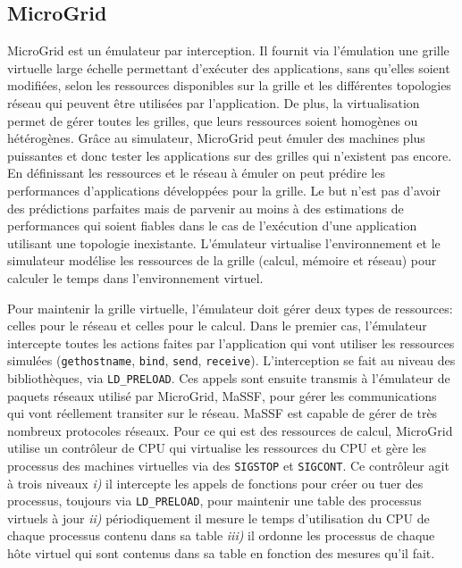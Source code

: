 \subsection{MicroGrid}
\label{subsection:MicroGrid}
MicroGrid \citep{MICROGRID_INIT, MICROGRID_CASANOVA} est un émulateur par interception. Il fournit via l'émulation une grille virtuelle large échelle permettant d'exécuter des applications, sans qu'elles soient modifiées, selon les ressources disponibles sur la grille et les différentes topologies réseau qui peuvent être utilisées par l'application. De plus, la virtualisation permet de gérer toutes les grilles, que leurs ressources soient homogènes ou hétérogènes. Grâce au simulateur, %
MicroGrid peut émuler des machines plus puissantes et donc tester les applications sur des grilles qui n'existent pas encore. En définissant les ressources et le réseau à émuler on peut prédire les performances d'applications développées pour la grille. Le but n'est pas d'avoir des prédictions parfaites mais de parvenir au moins à des estimations de performances qui soient fiables dans le cas de l'exécution d'une application utilisant une topologie inexistante. L'émulateur virtualise l'environnement et le simulateur modélise les ressources de la grille (calcul, mémoire et réseau) pour calculer le temps dans l'environnement virtuel.

Pour maintenir la grille virtuelle, l'émulateur doit gérer deux types de ressources: celles pour le réseau et celles pour le calcul. Dans le premier cas, l'émulateur intercepte toutes les actions faites par l'application qui vont utiliser les ressources simulées (\texttt{gethostname}, \texttt{bind}, \texttt{send}, \texttt{receive}). L'interception se fait au niveau des bibliothèques, via \texttt{LD\_PRELOAD}. Ces appels sont ensuite transmis à l'émulateur de paquets réseaux utilisé par MicroGrid, MaSSF, pour gérer les communications qui vont réellement transiter sur le réseau. MaSSF est capable de gérer de très nombreux protocoles réseaux.  Pour ce qui est des ressources de calcul, MicroGrid utilise un contrôleur de CPU qui virtualise les ressources du CPU et gère les processus des machines virtuelles via des \texttt{SIGSTOP} et \texttt{SIGCONT}. Ce contrôleur agit à trois niveaux \textit{i)} il intercepte les appels de fonctions pour créer ou tuer des processus, toujours via \texttt{LD\_PRELOAD}, pour maintenir une table des processus virtuels à jour \textit{ii)} périodiquement il mesure le temps d'utilisation du CPU de chaque processus contenu dans sa table \textit{iii)} il ordonne les processus de chaque hôte virtuel qui sont contenus dans sa table en fonction des mesures qu'il fait.

